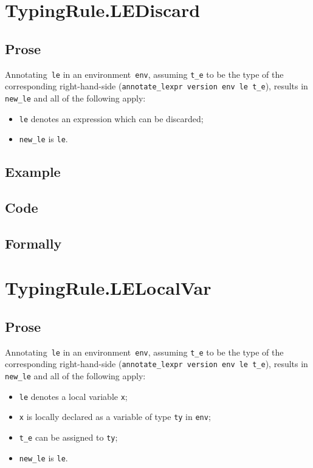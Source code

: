 \documentclass{book}
\begin{document}
\section{TypingRule.LEDiscard \label{sec:TypingRule.LEDiscard}}

  \subsection{Prose}
   Annotating~\texttt{le} in an environment~\texttt{env}, assuming
\texttt{t\_e} to be the type of the corresponding right-hand-side
(\texttt{annotate\_lexpr version env le t\_e}), results in \texttt{new\_le} and
all of the following apply:
   \begin{itemize}
   \item \texttt{le} denotes an expression which can be discarded;
   \item \texttt{new\_le} is \texttt{le}.
   \end{itemize}

  \subsection{Example}

  \subsection{Code}

\begin{emptyformal}
    \subsection{Formally}
\end{emptyformal}


\section{TypingRule.LELocalVar \label{sec:TypingRule.LELocalVar}}

   \subsection{Prose}
   Annotating~\texttt{le} in an environment~\texttt{env}, assuming
\texttt{t\_e} to be the type of the corresponding right-hand-side
(\texttt{annotate\_lexpr version env le t\_e}), results in \texttt{new\_le} and
all of the following apply:
   \begin{itemize}
   \item \texttt{le} denotes a local variable \texttt{x};
   \item \texttt{x} is locally declared as a variable of type \texttt{ty} in \texttt{env};
   \item \texttt{t\_e} can be assigned to \texttt{ty};
   \item \texttt{new\_le} is \texttt{le}.
   \end{itemize}
\end{document}
